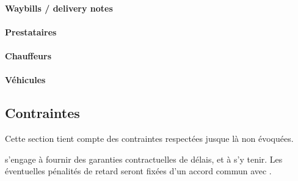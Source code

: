 \paragraph{Waybills / delivery notes}

\paragraph{Prestataires}

\paragraph{Chauffeurs}

\paragraph{Véhicules}

\subsection{Contraintes}
Cette section tient compte des contraintes respectées jusque là non évoquées.

\begin{constraint}
\amo s'engage à fournir des garanties contractuelles de délais, et à s'y tenir. Les éventuelles pénalités de retard seront fixées d'un accord commun avec \mo.
\end{constraint}
